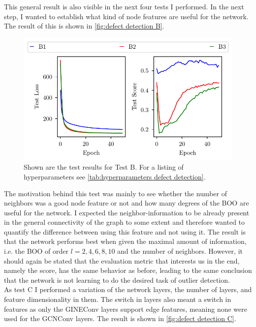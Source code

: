 \documentclass[11pt,a4paper]{article}
\begin{document}
This general result is also visible in the next four tests I performed. 
In the next step, I wanted to establish what kind of node features are useful for the network. 
The result of this is shown in \autoref{fig:defect detection B}. 
\begin{figure}[htbp]
\centering
\includegraphics{images/plots/defect_detection_B.pdf}
\caption{Shown are the test results for Test B. For a listing of hyperparameters see \autoref{tab:hyperparameters defect detection}.}
\label{fig:defect detection B}
\end{figure}
The motivation behind this test was mainly to see whether the number of neighbors was a good node feature or not and how many degrees of the BOO are useful for the network. 
I expected the neighbor-information to be already present in the general connectivity of the graph to some extent and therefore wanted to quantify the difference between using this feature and not using it.  
The result is that the network performs best when given the maximal amount of information, i.e. the BOO of order $l=2,4,6,8,10$ and the number of neighbors. 
However, it should again be stated that the evaluation metric that interests us in the end, namely the score, has the same behavior as before, leading to the same conclusion that the network is not learning to do the desired task of outlier detection. \\

As test C I performed a variation of the network layers, the number of layers, and feature dimensionality in them. 
The switch in layers also meant a switch in features as only the GINEConv layers support edge features, meaning none were used for the GCNConv layers. 
The result is shown in \autoref{fig:defect detection C}. 
\end{document}
